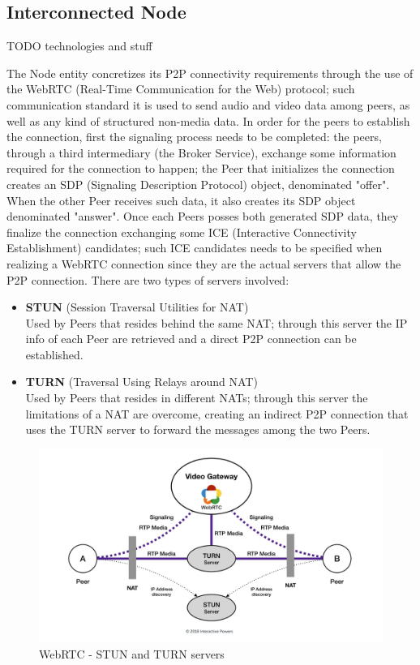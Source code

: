 \subsection{Interconnected Node}
TODO technologies and stuff

The Node entity concretizes its P2P connectivity requirements through the use of the WebRTC (Real-Time Communication for the Web) protocol; such communication standard it is used to send audio and video data among peers, as well as any kind of structured non-media data. In order for the peers to establish the connection, first the signaling process needs to be completed: the peers, through a third intermediary (the Broker Service), exchange some information required for the connection to happen; the Peer that initializes the connection creates an SDP (Signaling Description Protocol) object, denominated "offer". When the other Peer receives such data, it also creates its SDP object denominated "answer". Once each Peers posses both generated SDP data, they finalize the connection exchanging some ICE (Interactive Connectivity Establishment) candidates; such ICE candidates needs to be specified when realizing a WebRTC connection since they are the actual servers that allow the P2P connection. There are two types of servers involved:
\begin{itemize}
    \item \textbf{STUN} (Session Traversal Utilities for NAT)\\
    Used by Peers that resides behind the same NAT; through this server the IP info of each Peer are retrieved and a direct P2P connection can be established.
    \item \textbf{TURN} (Traversal Using Relays around NAT)\\
    Used by Peers that resides in different NATs; through this server the limitations of a NAT are overcome, creating an indirect P2P connection that uses the TURN server to forward the messages among the two Peers.
\end{itemize}

\begin{figure}[!ht]
    \centering
    \includegraphics[width=\linewidth]{document/chapters/chapter_7/images/webrtc.jpeg}
    \caption{WebRTC - STUN and TURN servers}
    \label{fig:webrtc}
\end{figure}

